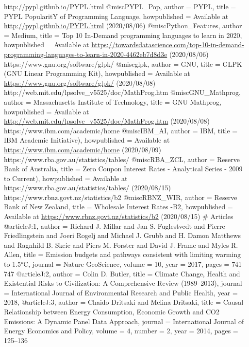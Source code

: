 http://pypl.github.io/PYPL.html
@misc{PYPL_Pop,
    author = {PYPL},
    title = {PYPL PopularitY of Programming Language},
    howpublished = {Available at \url{http://pypl.github.io/PYPL.html} (2020/08/06)}
}
@misc{Python_Features,
    author = {Medium},
    title = {Top 10 In-Demand programming languages to learn in 2020},
    howpublished = {Available at \url{https://towardsdatascience.com/top-10-in-demand-programming-languages-to-learn-in-2020-4462eb7d8d3e} (2020/08/06)}
}
https://www.gnu.org/software/glpk/
@misc{glpk,
    author = {GNU},
    title = {GLPK (GNU Linear Programming Kit)},
    howpublished = {Available at \url{https://www.gnu.org/software/glpk/} (2020/08/08)}
}
http://web.mit.edu/lpsolve_v5525/doc/MathProg.htm
@misc{GNU_Mathprog,
    author = {Massachusetts Institute of Technology},
    title = {GNU Mathprog},
    howpublished = {Available at \url{http://web.mit.edu/lpsolve_v5525/doc/MathProg.htm} (2020/08/08)}
}
https://www.ibm.com/academic/home
@misc{IBM_AI,
    author = {IBM},
    title = {IBM Academic Initiative)},
    howpublished = {Available at \url{https://www.ibm.com/academic/home} (2020/08/09)}
}
https://www.rba.gov.au/statistics/tables/
@misc{RBA_ZCL,
    author = {Reserve Bank of Australia},
    title = {Zero Coupon Interest Rates - Analytical Series - 2009 to Current)},
    howpublished = {Available at \url{https://www.rba.gov.au/statistics/tables/} (2020/08/15)}
}
https://www.rbnz.govt.nz/statistics/b2
@misc{RBNZ_WIR,
    author = {Reserve Bank of New Zealand},
    title = {Wholesale Interest Rates -B2},
    howpublished = {Available at \url{https://www.rbnz.govt.nz/statistics/b2} (2020/08/15)}
}
# Articles
@article{J:1,
author = {Richard J. Millar and Jan S. Fuglestvedt and Pierre Friedlingstein and Joeri Rogelj and Michael J. Grubb and H. Damon Matthews and Ragnhild B. Skeie and Piers M. Forster and David J. Frame and Myles R. Allen},
title = {Emission budgets and pathways consistent with limiting warming to 1.5°C},
journal = {Nature GeoScience},
volume = {10},
year = {2017},
pages = {741--747}
}
@article{J:2,
author = {Colin D. Butler},
title = {Climate Change, Health and Existential Risks to Civilization: A Comprehensive Review (1989–2013)},
journal = {International Journal of Environmental Research and Public Health},
year = {2018},
}
@article{J:3,
author = {Chaido Dritsaki and Melina Dritsaki},
title = {Causal Relationship between Energy Consumption, Economic Growth and
CO2 Emissions: A Dynamic Panel Data Approach},
journal = {International Journal of Energy Economics and Policy},
volume = {4},
number = {2},
year = {2014},
pages = {125--136}
}
